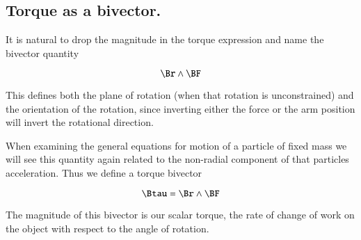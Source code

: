 \subsection{Torque as a bivector.}

It is natural to drop the magnitude in the torque expression and name the
bivector quantity

\[
   \Br \wedge \BF
\]

This defines both the plane of rotation (when that rotation is unconstrained) and the orientation of the rotation, since inverting either the force or the arm position will invert the rotational direction.

When examining the general equations for motion of a particle of fixed mass we will see this quantity again related to the non-radial component of that particles acceleration.  Thus we define a torque bivector

\[
\Btau = \Br \wedge \BF
\]

The magnitude of this bivector is our scalar torque, the rate of change of work on the object with respect to the angle of rotation.
